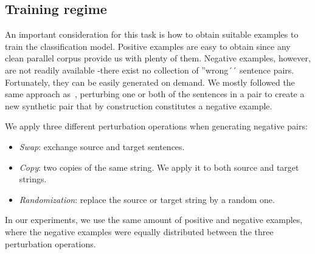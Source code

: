 \subsection{Training regime}
\label{ssec:training}

An important consideration for this task is how to obtain suitable examples to train the classification model. Positive examples are easy to obtain since any clean parallel corpus provide us with plenty of them. Negative examples, however, are not readily available -there exist no collection of ''wrong´´ sentence pairs. Fortunately, they can be easily generated on demand. We mostly followed the same approach as~\cite{Hainan17}, perturbing one or both of the sentences in a pair to create a new synthetic pair that by construction constitutes a negative example.

We apply three different perturbation operations when generating negative pairs:
\begin{itemize}
\item \textit{Swap}: exchange source and target sentences.
\item \textit{Copy}: two copies of the same string. We apply it to both source and target strings.
\item \textit{Randomization}: replace the source or target string by a random one.
\end{itemize}

In our experiments, we use the same amount of positive and negative examples, where the negative examples were equally distributed between the three perturbation operations.

